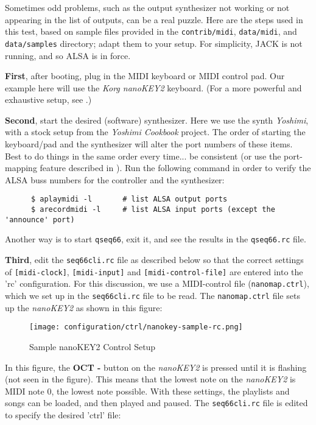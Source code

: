    Sometimes odd problems, such as the output synthesizer not working
   or not appearing in the list of outputs, can be a real puzzle.
   Here are the steps used in this test, based on sample files provided in the
   \texttt{contrib/midi}, \texttt{data/midi}, and \texttt{data/samples}
   directory; adapt them to your setup.  For
   simplicity, JACK is not running, and so ALSA is in force.

   \textbf{First}, after booting, plug in the MIDI keyboard or MIDI control
   pad.  Our example here will use the \textsl{Korg nanoKEY2} keyboard.  
   (For a more powerful and exhaustive setup, see
   .)

   \textbf{Second}, start the desired (software) synthesizer.
   Here we use the synth \textsl{Yoshimi}, with a stock setup from the
   \textsl{Yoshimi Cookbook} project.
   The order of starting the keyboard/pad and the synthesizer
   will alter the port numbers of these items.  Best to do things in the same
   order every time... be consistent (or use the port-mapping feature
   described in ).
   Run the following command in order to verify the ALSA buss numbers for
   the controller and the synthesizer:

   \begin{verbatim}
      $ aplaymidi -l       # list ALSA output ports
      $ arecordmidi -l     # list ALSA input ports (except the 'announce' port)
   \end{verbatim}

   Another way is to start \texttt{qseq66}, exit it,
   and see the results in the \texttt{qseq66.rc} file.

   \textbf{Third}, edit the \texttt{seq66cli.rc}
   file as described below so that the correct settings of
   \texttt{[midi-clock]}, \texttt{[midi-input]} and
   \texttt{[midi-control-file]} are entered into the 'rc' configuration.
   For this discussion, we use a MIDI-control file 
   (\texttt{nanomap.ctrl}), which we set up
   in the \texttt{seq66cli.rc} file to be read.
   The \texttt{nanomap.ctrl} file sets up the \textsl{nanoKEY2} as
   shown in this figure:

\begin{figure}[H]
   \centering 
   \texttt{[image: configuration/ctrl/nanokey-sample-rc.png]}
   \caption{Sample nanoKEY2 Control Setup}
   \label{fig:headless_nanokey2_setup}
\end{figure}

   In this figure, the \textbf{OCT -} button on the
   \textsl{nanoKEY2} is pressed until
   it is flashing (not seen in the figure).
   This means that the lowest note on the
   \textsl{nanoKEY2} is MIDI note 0, the lowest
   note possible.
   With these settings, the playlists and songs can be loaded,
   and then played and paused.
   The \texttt{seq66cli.rc} file is edited to specify the desired 'ctrl' file:

